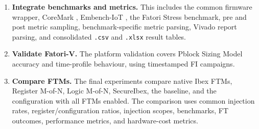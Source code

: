 \begin{enumerate}
    \item \textbf{Integrate benchmarks and metrics.} This includes the common firmware wrapper, CoreMark \cite{coremark}, Embench-IoT \cite{embench-iot}, the Fatori Stress benchmark, pre and post metric sampling, benchmark-specific metric parsing, Vivado report parsing, and consolidated \texttt{.csv} and \texttt{.xlsx} result tables.

    \item \textbf{Validate \ac{Fatori-V}.} The platform validation covers Pblock Sizing Model accuracy and time-profile behaviour, using timestamped \ac{FI} campaigns.

    \item \textbf{Compare \acp{FTM}.} The final experiments compare native Ibex \acp{FTM}, Register M-of-N, Logic M-of-N, SecureIbex, the baseline, and the configuration with all \acp{FTM} enabled. The comparison uses common injection rates, register/configuration ratios, injection scopes, benchmarks, \ac{FT} outcomes, performance metrics, and hardware-cost metrics.
\end{enumerate}





